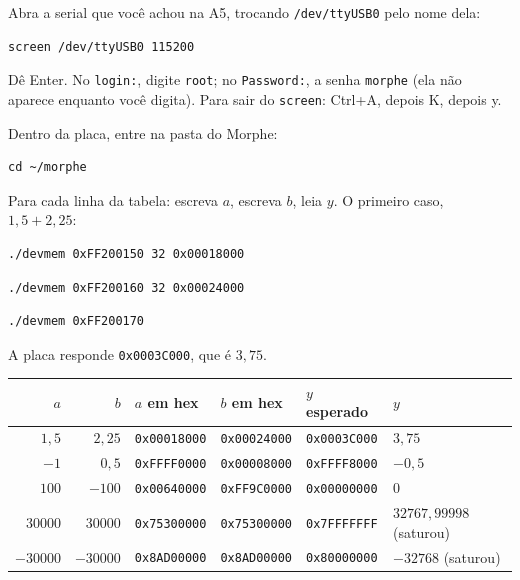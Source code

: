 \documentclass[11pt,a4paper,oneside]{article}
\begin{document}
\begin{faca}
Abra a serial que você achou na A5, trocando \texttt{/dev/ttyUSB0} pelo
nome dela:
\begin{lstlisting}[style=sh]
screen /dev/ttyUSB0 115200
\end{lstlisting}
Dê Enter. No \texttt{login:}, digite \texttt{root}; no \texttt{Password:}, a senha
\texttt{morphe} (ela não aparece enquanto você digita). Para sair do
\texttt{screen}: Ctrl+A, depois K, depois y.
\end{faca}

\begin{faca}
Dentro da placa, entre na pasta do Morphe:
\begin{lstlisting}[style=sh]
cd ~/morphe
\end{lstlisting}
Para cada linha da tabela: escreva \(a\), escreva \(b\), leia \(y\). O
primeiro caso, \(1{,}5 + 2{,}25\):
\begin{lstlisting}[style=sh]
./devmem 0xFF200150 32 0x00018000
\end{lstlisting}
\begin{lstlisting}[style=sh]
./devmem 0xFF200160 32 0x00024000
\end{lstlisting}
\begin{lstlisting}[style=sh]
./devmem 0xFF200170
\end{lstlisting}
A placa responde \texttt{0x0003C000}, que é \(3{,}75\).
\end{faca}

\begin{center}\small
\begin{tabular}{@{}rrllll@{}}
\toprule
\(a\) & \(b\) & \(a\) em hex & \(b\) em hex & \(y\) esperado & \(y\) \\
\midrule
\(1{,}5\) & \(2{,}25\) & \texttt{0x00018000} & \texttt{0x00024000} & \texttt{0x0003C000} & \(3{,}75\) \\
\(-1\) & \(0{,}5\) & \texttt{0xFFFF0000} & \texttt{0x00008000} & \texttt{0xFFFF8000} & \(-0{,}5\) \\
\(100\) & \(-100\) & \texttt{0x00640000} & \texttt{0xFF9C0000} & \texttt{0x00000000} & \(0\) \\
\(30000\) & \(30000\) & \texttt{0x75300000} & \texttt{0x75300000} & \texttt{0x7FFFFFFF} & \(32767{,}99998\) (saturou) \\
\(-30000\) & \(-30000\) & \texttt{0x8AD00000} & \texttt{0x8AD00000} & \texttt{0x80000000} & \(-32768\) (saturou) \\
\bottomrule
\end{tabular}
\end{center}
\end{document}
